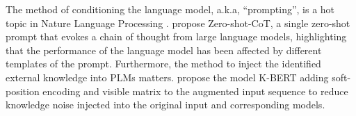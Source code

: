 The method of conditioning the language model, a.k.a, ``prompting'', is a hot topic in Nature Language Processing \citet{pengfeiliu}. \citet{kojima_large_2022} propose Zero-shot-CoT, a single zero-shot prompt that evokes a chain of thought from large language models, highlighting that the performance of the language model has been affected by different templates of the prompt.
Furthermore, the method to inject the identified external knowledge into PLMs matters. \citet{liu_k-bert_2020} propose the model K-BERT adding soft-position encoding and visible matrix to the augmented input sequence to reduce knowledge noise injected into the original input and corresponding models. 

